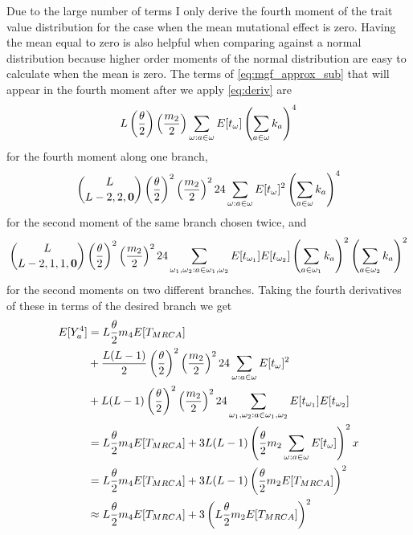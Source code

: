 Due to the large number of terms I only derive the fourth moment of the trait
value distribution for the case when the mean mutational effect is zero. Having
the mean equal to zero is also helpful when comparing against a normal
distribution because higher order moments of the normal distribution are easy to
calculate when the mean is zero. The terms of \eqref{eq:mgf_approx_sub} that
will appear in the fourth moment after we apply \eqref{eq:deriv} are
\begin{equation*}
  L \left(\frac{\theta}{2}\right) \left(\frac{m_2}{2}\right)
  \sum_{\omega:a\in \omega} E[t_\omega] \left(\sum_{a \in \omega} k_a\right)^4
\end{equation*}
for the fourth moment along one branch,
\begin{equation*}
  \binom{L}{L-2,2,\mathbf{0}}\left(\frac{\theta}{2}\right)^2\left(\frac{m_2}{2}\right)^2
  24 \sum_{\omega:a\in \omega} E[t_\omega]^2 \left(\sum_{a \in \omega} k_a\right)^4
\end{equation*}
for the second moment of the same branch chosen twice, and
\begin{equation*}
  \binom{L}{L-2,1,1,\mathbf{0}}\left(\frac{\theta}{2}\right)^2\left(\frac{m_2}{2}\right)^2
  24 \sum_{\omega_1 , \omega_2: a \in \omega_1 , \omega_2} E[t_{\omega_1}]E[t_{\omega_2}]
  \left(\sum_{a \in \omega_1} k_a\right)^2\left(\sum_{a \in \omega_2} k_a\right)^2
\end{equation*}
for the second moments on two different branches. Taking the fourth derivatives
of these in terms of the desired branch we get
\begin{align}
  \label{eq:mom4}
  E[Y_a^4] &= L\frac{\theta}{2} m_4 E[T_{MRCA}] \nonumber \\
  &+ \frac{L(L-1)}{2} \left(\frac{\theta}{2}\right)^2\left( \frac{m_2}{2} \right)^2
  24 \sum_{\omega:a\in \omega} E[t_\omega]^2 \nonumber \\
  &+ L(L-1) \left(\frac{\theta}{2}\right)^2\left( \frac{m_2}{2} \right)^2
  24 \sum_{\omega_1 , \omega_2: a \in \omega_1 , \omega_2} E[t_{\omega_1}]E[t_{\omega_2}] \nonumber \\
  &= L\frac{\theta}{2} m_4 E[T_{MRCA}] +
  3L(L-1)\left( \frac{\theta}{2} m_2 \sum_{\omega:a\in \omega} E[t_\omega] \right)^2x \nonumber \\
  &= L\frac{\theta}{2} m_4 E[T_{MRCA}] +
  3L(L-1)\left( \frac{\theta}{2} m_2 E[T_{MRCA}] \right)^2 \\
  &\approx L\frac{\theta}{2} m_4 E[T_{MRCA}] +
  3\left(L \frac{\theta}{2} m_2 E[T_{MRCA}] \right)^2 \nonumber 
\end{align}
